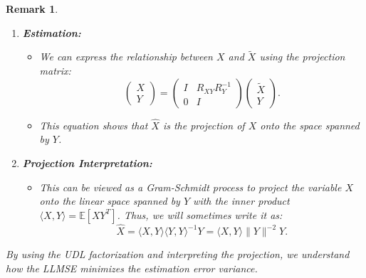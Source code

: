 \documentclass[a4 paper]{article}
\numberwithin{equation}{section}
\theoremstyle{boldStyle}
\newtheorem{remark}{Remark}[section]
\theoremstyle{boldBlueStyle}
\theoremstyle{boldPurpleStyle}
\theoremstyle{boldRedStyle}
\theoremstyle{boldGreenStyle}
\begin{document}
\begin{remark}
\begin{enumerate}
      \item \textbf{Estimation:}
      \begin{itemize}
          \item We can express the relationship between \( X \) and \( \tilde{X} \) using the projection matrix:
          \[
          \begin{pmatrix}
          X \\
          Y
          \end{pmatrix} =
          \begin{pmatrix}
          I & R_{XY} R_Y^{-1} \\
          0 & I
          \end{pmatrix}
          \begin{pmatrix}
          \tilde{X} \\
          Y
          \end{pmatrix}.
          \]
          \item This equation shows that \( \hat{X} \) is the projection of \( X \) onto the space spanned by \( Y \).
      \end{itemize}
      
      \item \textbf{Projection Interpretation:}
      \begin{itemize}
          \item This can be viewed as a Gram-Schmidt process to project the variable \( X \) onto the linear space spanned by \( Y \) with the inner product \( \langle X, Y \rangle = \mathbb{E}[XY^T] \). Thus, we will sometimes write it as:
          \[
          \hat{X} = \langle X, Y \rangle \langle Y, Y \rangle^{-1} Y = \langle X, Y \rangle \|Y\|^{-2} Y.
          \]
      \end{itemize}
  \end{enumerate}
  
  By using the UDL factorization and interpreting the projection, we understand how the LLMSE minimizes the estimation error variance.
  \end{remark}











\newpage
\end{document}
